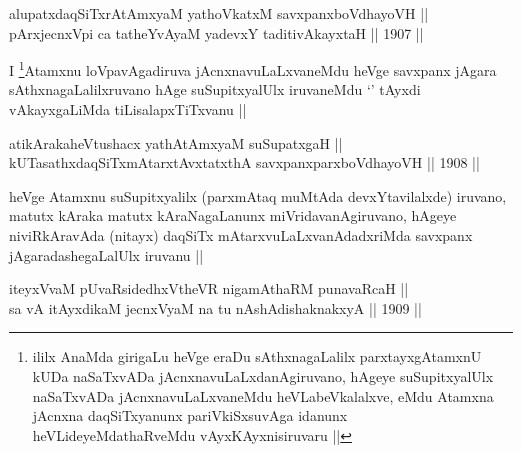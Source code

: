 
\begin{shl}
alupatxdaqSiTxrAtAmx\s yaM yathoVkatxM savxpanxboVdhayoVH || \\
pArxjecnxV\s pi ca tatheYvAyaM yadevxY taditivAkayxtaH ||  1907 ||  
\end{shl}

\begin{artha}
I \footnote[1]{ililx AnaMda girigaLu heVge eraDu sAthxnagaLalilx
  parxtayxgAtamxnU kUDa naSaTxvADa jAcnxnavuLaLxdanAgiruvano, hAgeye
  suSupitxyalUlx naSaTxvADa jAcnxnavuLaLxvaneMdu heVLabeVkalalxve,
  eMdu Atamxna jAcnxna daqSiTxyanunx pariVkiSxsuvAga idanunx
  heVLideyeMdathaRveMdu vAyxKAyxnisiruvaru ||}Atamxnu loVpavAgadiruva jAcnxnavuLaLxvaneMdu heVge
savxpanx jAgara sAthxnagaLalilxruvano hAge suSupitxyalUlx iruvaneMdu
`\stext' tAyxdi vAkayxgaLiMda tiLisalapxTiTxvanu ||
\end{artha}


\begin{shl}
atikArakaheVtushacx yathA\s \s tAmx\s yaM suSupatxgaH || \\
kUTasathxdaqSiTxmAtarxtAvxtatxthA savxpanxparxboVdhayoVH ||  1908 ||  
\end{shl}

\begin{artha}
heVge Atamxnu suSupitxyalilx (parxmAtaq muMtAda devxYtavilalxde)
iruvano, matutx kAraka matutx kAraNagaLanunx miVridavanAgiruvano,
hAgeye niviRkAravAda (nitayx) daqSiTx mAtarxvuLaLxvanAdadxriMda
savxpanx jAgaradashegaLalUlx iruvanu ||
\end{artha}

\begin{shl}
iteyxVvaM pUvaRsidedhxV\s theVR nigamAthaRM punavaRcaH || \\
sa vA itAyxdikaM jecnxVyaM na tu nAshAdishaknakxyA ||  1909 ||  
\end{shl}

